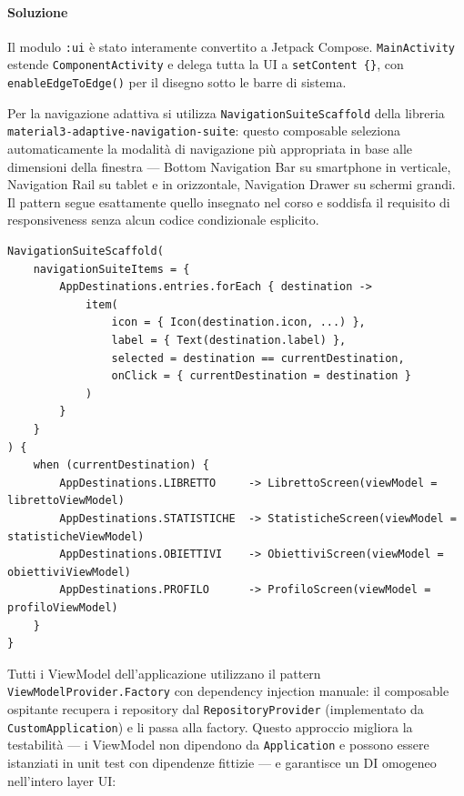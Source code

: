 \documentclass[a4paper,12pt]{report}
\begin{document}
    \paragraph{Soluzione}
    Il modulo \texttt{:ui} è stato interamente convertito a Jetpack Compose.
    \texttt{MainActivity} estende \texttt{ComponentActivity} e delega tutta la UI
    a \texttt{setContent \{\}}, con \texttt{enableEdgeToEdge()} per il disegno
    sotto le barre di sistema.

    Per la navigazione adattiva si utilizza \texttt{NavigationSuiteScaffold} della
    libreria \texttt{material3-adaptive-}\texttt{navigation-suite}: questo composable seleziona
    automaticamente la modalità di navigazione più appropriata in base alle dimensioni
    della finestra --- Bottom Navigation Bar su smartphone in verticale, Navigation Rail
    su tablet e in orizzontale, Navigation Drawer su schermi grandi.
    Il pattern segue esattamente quello insegnato nel corso e soddisfa il requisito
    di responsiveness senza alcun codice condizionale esplicito.

    \begin{lstlisting}
NavigationSuiteScaffold(
    navigationSuiteItems = {
        AppDestinations.entries.forEach { destination ->
            item(
                icon = { Icon(destination.icon, ...) },
                label = { Text(destination.label) },
                selected = destination == currentDestination,
                onClick = { currentDestination = destination }
            )
        }
    }
) {
    when (currentDestination) {
        AppDestinations.LIBRETTO     -> LibrettoScreen(viewModel = librettoViewModel)
        AppDestinations.STATISTICHE  -> StatisticheScreen(viewModel = statisticheViewModel)
        AppDestinations.OBIETTIVI    -> ObiettiviScreen(viewModel = obiettiviViewModel)
        AppDestinations.PROFILO      -> ProfiloScreen(viewModel = profiloViewModel)
    }
}
    \end{lstlisting}


    Tutti i ViewModel dell'applicazione utilizzano il pattern \texttt{ViewModelProvider.Factory}
    con dependency injection manuale: il composable ospitante recupera i repository dal
    \texttt{RepositoryProvider} (implementato da \texttt{CustomApplication}) e li passa
    alla factory. Questo approccio migliora la testabilità --- i ViewModel non dipendono
    da \texttt{Application} e possono essere istanziati in unit test con dipendenze
    fittizie --- e garantisce un DI omogeneo nell'intero layer UI:
\end{document}
